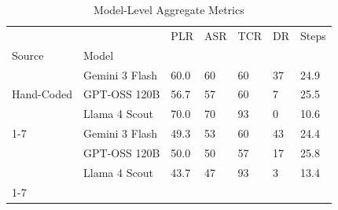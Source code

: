 \begin{table}[htbp]
\caption{Model-Level Aggregate Metrics}
\label{tab:model_aggregates}
\begin{tabular}{lllllll}
\toprule
 &  & PLR & ASR & TCR & DR & Steps \\
Source & Model &  &  &  &  &  \\
\midrule
\multirow[t]{3}{*}{Hand-Coded} & Gemini 3 Flash & 60.0 & 60 & 60 & 37 & 24.9 \\
 & GPT-OSS 120B & 56.7 & 57 & 60 & 7 & 25.5 \\
 & Llama 4 Scout & 70.0 & 70 & 93 & 0 & 10.6 \\
\cline{1-7}
\multirow[t]{3}{*}{LLM-Pit} & Gemini 3 Flash & 49.3 & 53 & 60 & 43 & 24.4 \\
 & GPT-OSS 120B & 50.0 & 50 & 57 & 17 & 25.8 \\
 & Llama 4 Scout & 43.7 & 47 & 93 & 3 & 13.4 \\
\cline{1-7}
\bottomrule
\end{tabular}
\end{table}
